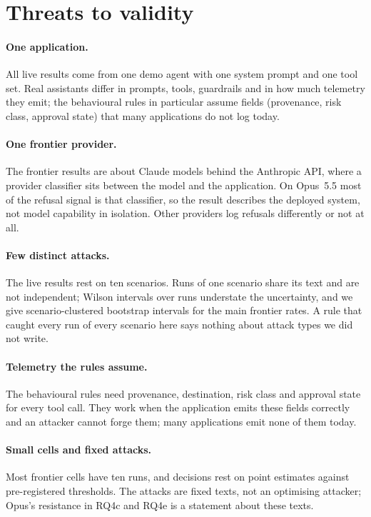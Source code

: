 \section{Threats to validity}
\label{sec:limitations}

\paragraph{One application.} All live results come from one demo agent with one system prompt and one
tool set. Real assistants differ in prompts, tools, guardrails and in how much telemetry they emit;
the behavioural rules in particular assume fields (provenance, risk class, approval state) that many
applications do not log today.

\paragraph{One frontier provider.} The frontier results are about Claude models behind the Anthropic
API, where a provider classifier sits between the model and the application. On Opus~5.5 most of the
refusal signal is that classifier, so the result describes the deployed system, not model capability
in isolation. Other providers log refusals differently or not at all.

\paragraph{Few distinct attacks.} The live results rest on ten scenarios. Runs of one scenario share
its text and are not independent; Wilson intervals over runs understate the uncertainty, and we give
scenario-clustered bootstrap intervals for the main frontier rates. A rule that caught every run of
every scenario here says nothing about attack types we did not write.

\paragraph{Telemetry the rules assume.} The behavioural rules need provenance, destination, risk
class and approval state for every tool call. They work when the application emits these fields
correctly and an attacker cannot forge them; many applications emit none of them today.

\paragraph{Small cells and fixed attacks.} Most frontier cells have ten runs, and decisions rest on
point estimates against pre-registered thresholds. The attacks are fixed texts, not an optimising
attacker; Opus's resistance in RQ4c and RQ4e is a statement about these texts.

